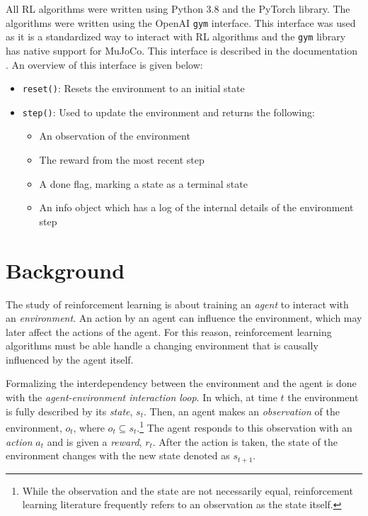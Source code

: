 \documentclass[conference]{IEEEtran}
\newcommand{\size}[2]{{\fontsize{#1}{0}\selectfont#2}}
\newcommand{\code}[1]{\colorbox{light-gray}{\size{8}{\texttt{#1}}}}
\begin{document}
All RL algorithms were written using Python 3.8 and the PyTorch library. The algorithms were written using the OpenAI \code{gym} interface. This interface was used as it is a standardized way to interact with RL algorithms and the \code{gym} library has native support for MuJoCo. This interface is described in the documentation \cite{gym_docs}. An overview of this interface is given below:

\begin{itemize}
    \item \code{reset()}: Resets the environment to an initial state
    \item \code{step()}: Used to update the environment and returns the following:
          \begin{itemize}
              \item An observation of the environment
              \item The reward from the most recent step
              \item A done flag, marking a state as a terminal state
              \item An info object which has a log of the internal details of the environment step
          \end{itemize}
\end{itemize}

\section{Background}

The study of reinforcement learning is about training an \textit{agent} to interact with an \textit{environment}. An action by an agent can influence the environment, which may later affect the actions of the agent. For this reason, reinforcement learning algorithms must be able handle a changing environment that is causally influenced by the agent itself.

Formalizing the interdependency between the environment and the agent is done with the \textit{agent-environment interaction loop}. In which, at time $t$ the environment is fully described by its \textit{state}, $s_t$. Then, an agent makes an \textit{observation} of the environment, $o_t$, where $o_t \subseteq s_t$.\footnote{While the observation and the state are not necessarily equal, reinforcement learning literature frequently refers to an observation as the state itself.} The agent responds to this observation with an \textit{action} $a_t$ and is given a \textit{reward}, $r_t$. After the action is taken, the state of the environment changes with the new state denoted as $s_{t+1}$.
\end{document}
